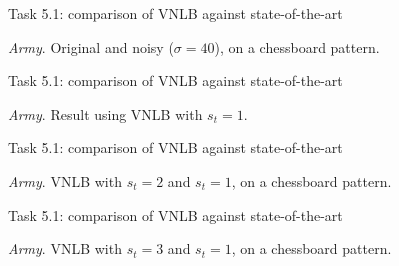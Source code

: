 \documentclass[mathserif, 8pt]{beamer}
\makeatletter
\newcounter{multipleslide}
\newcommand{\multipleframe}{%
\setcounter{multipleslide}{\value{framenumber}}
\stepcounter{multipleslide}
\patchcmd{\beamer@@tmpl@footline}%
	{\insertframenumber}%
	{\themultipleslide}%
	{}%
	{}%
}
\makeatother
\begin{document}
\multipleframe
\begin{frame}{Task 5.1: comparison of VNLB against state-of-the-art}
	\begin{center}
	\end{center}

	\begin{center}
		\emph{Army}. Original and noisy ($\sigma = 40$), on a chessboard pattern.
	\end{center}
\end{frame}
\begin{frame}{Task 5.1: comparison of VNLB against state-of-the-art}
	\begin{center}
	\end{center}

	\begin{center}
		\emph{Army}. Result using VNLB with $s_t = 1$.
	\end{center}
\end{frame}
\begin{frame}{Task 5.1: comparison of VNLB against state-of-the-art}
	\begin{center}
	\end{center}

	\begin{center}
		\emph{Army}. VNLB with $s_t = 2$ and $s_t = 1$, on a chessboard pattern.
	\end{center}
\end{frame}
\begin{frame}{Task 5.1: comparison of VNLB against state-of-the-art}
	\begin{center}
	\end{center}

	\begin{center}
		\emph{Army}. VNLB with $s_t = 3$ and $s_t = 1$, on a chessboard pattern.
	\end{center}
\end{frame}
\end{document}
